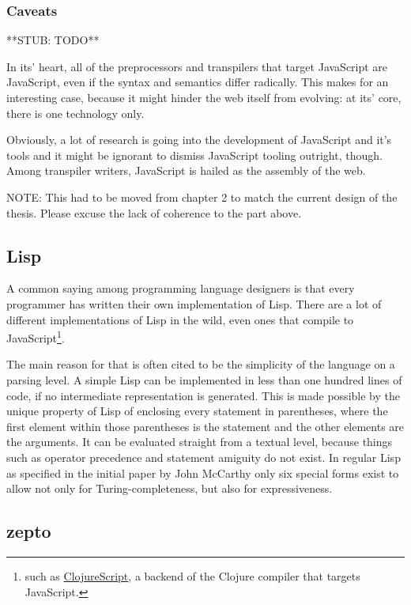 \documentclass[oneside,11pt,xetex]{scrbook}
\begin{document}
\subsubsection{Caveats} %

**STUB: TODO**

In its' heart, all of the preprocessors and transpilers that target JavaScript
are JavaScript, even if the syntax and semantics differ radically. This makes
for an interesting case, because it might hinder the web itself from evolving:
at its' core, there is one technology only.

Obviously, a lot of research is going into the development of JavaScript and
it's tools and it might be ignorant to dismiss JavaScript tooling outright,
though. Among transpiler writers, JavaScript is hailed as the assembly of the web.

NOTE: This had to be moved from chapter 2 to match the current design of the thesis. Please
excuse the lack of coherence to the part above.

\subsection{Lisp}

A common saying among programming language designers is that every programmer has written
their own implementation of Lisp. There are a lot of different implementations of Lisp
in the wild, even ones that compile to JavaScript\footnote{such as \href{https://github.com/clojure/clojurescript}{ClojureScript},
a backend of the Clojure compiler that targets JavaScript.}.

The main reason for that is often cited to be the simplicity of the language on a parsing
level. A simple Lisp can be implemented in less than one hundred lines of code, if no
intermediate representation is generated. This is made possible by the unique property
of Lisp of enclosing every statement in parentheses, where the first element within
those parentheses is the statement and the other elements are the arguments.
It can be evaluated straight from a textual level, because things such as operator precedence
and statement amiguity do not exist. In regular Lisp as specified in the initial paper by
John McCarthy\parencite{JCM} only six special forms exist to allow not only for Turing-completeness,
but also for expressiveness.

\subsection{zepto}
\end{document}
